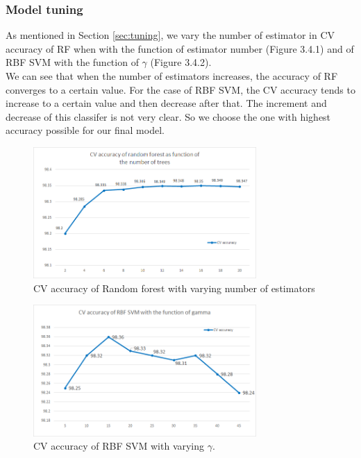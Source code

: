 \documentclass{article}
\begin{document}
\subsubsection{Model tuning}
As mentioned in Section \ref{sec:tuning}, we vary the number of estimator in CV accuracy of RF when with the function of estimator number (Figure 3.4.1) and of RBF SVM with the function of $\gamma$ (Figure 3.4.2).\\
We can see that when the number of estimators increases, the accuracy of RF converges to a certain value. For the case of RBF SVM, the CV accuracy tends to increase to a certain value and then decrease after that. The increment and decrease of this classifer is not very clear. So we choose the one with highest accuracy possible for our final model.
\begin{figure}[htb]
\begin{minipage}[b]{1.0\linewidth}
  \centering
  \centerline{\includegraphics[width=8.5cm]{RFestimator.png}}
\end{minipage}
\label{fig:RFestimator}
\caption{CV accuracy of Random forest with varying number of estimators}
\end{figure}
\begin{figure}[htb]
\begin{minipage}[b]{1.0\linewidth}
  \centering
  \centerline{\includegraphics[width=8.5cm]{RBFSVMgamma.png}}
\end{minipage}
\label{fig:RBFSVMgamma}
\caption{CV accuracy of RBF SVM with varying $\gamma$.}
\end{figure}
\end{document}
